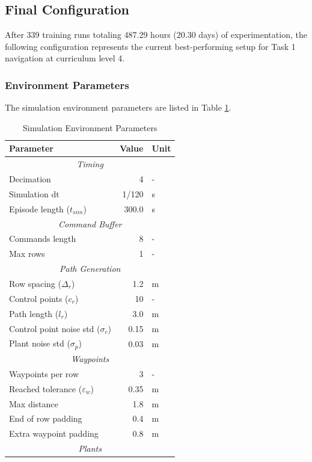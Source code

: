 \documentclass[11pt,a4paper,twocolumn]{article}
\begin{document}
\subsection{Final Configuration}
After 339 training runs totaling 487.29 hours (20.30 days) of experimentation, the following configuration represents the current best-performing setup for Task 1 navigation at curriculum level 4.

\subsubsection{Environment Parameters}
The simulation environment parameters are listed in Table \ref{tab:sim_params}.

\begin{table}[h]
\centering
\caption{Simulation Environment Parameters}
\label{tab:sim_params}
\small
\begin{tabular}{|l|r|l|}
\hline
\textbf{Parameter} & \textbf{Value} & \textbf{Unit} \\
\hline
\multicolumn{3}{|c|}{\textit{Timing}} \\
\hline
Decimation & 4 & - \\
Simulation dt & 1/120 & s \\
Episode length ($t_{sim}$) & 300.0 & s \\
\hline
\multicolumn{3}{|c|}{\textit{Command Buffer}} \\
\hline
Commands length & 8 & - \\
Max rows & 1 & - \\
\hline
\multicolumn{3}{|c|}{\textit{Path Generation}} \\
\hline
Row spacing ($\Delta_r$) & 1.2 & m \\
Control points ($c_r$) & 10 & - \\
Path length ($l_r$) & 3.0 & m \\
Control point noise std ($\sigma_c$) & 0.15 & m \\
Plant noise std ($\sigma_p$) & 0.03 & m \\
\hline
\multicolumn{3}{|c|}{\textit{Waypoints}} \\
\hline
Waypoints per row & 3 & - \\
Reached tolerance ($\varepsilon_w$) & 0.35 & m \\
Max distance & 1.8 & m \\
End of row padding & 0.4 & m \\
Extra waypoint padding & 0.8 & m \\
\hline
\multicolumn{3}{|c|}{\textit{Plants}} \\

\end{tabular}
\end{table}
\end{document}
